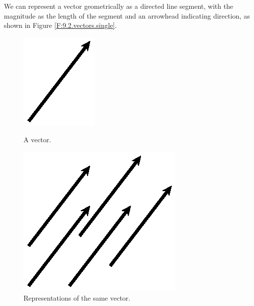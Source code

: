 \vspace*{5pt}
\nin {} \vspace*{5pt}

We can represent a vector geometrically as a directed line segment,
with the magnitude as the length of the segment and an arrowhead
indicating direction, as shown in Figure \ref{F:9.2.vectors.single}.

\begin{figure}[ht]
  \begin{center}
    \begin{minipage}{2.5in}
      \begin{center}
        \includegraphics{figures/fig_9_2_single.eps}
      \end{center}
      \caption{A vector.}
      \label{F:9.2.vectors.single}
    \end{minipage}
    \begin{minipage}{3.3in}
      \begin{center}
        \includegraphics{figures/fig_9_2_multiple.eps}
      \end{center}
      \caption{Representations of the same vector.}
      \label{F:9.2.vectors.many}
    \end{minipage}
  \end{center}
\end{figure}


